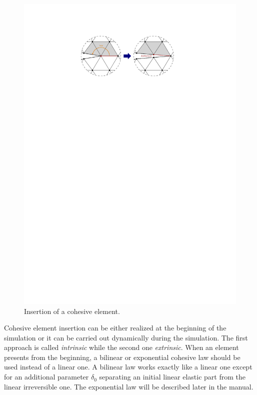 \begin{figure}
  \centering
  \includegraphics[width=.9\textwidth]{figures/insertion}
  \caption{Insertion of a cohesive element.}
  \label{fig:smm:coh:insertion}
\end{figure}

Cohesive element insertion can be either realized at the beginning of
the simulation or it can be carried out dynamically during the
simulation. The first approach is called \emph{intrinsic} while the
second one \emph{extrinsic}. When an element presents from the
beginning, a bilinear or exponential cohesive law should be used
instead of a linear one. A bilinear law works exactly like a linear
one except for an additional parameter $\delta_0$ separating an
initial linear elastic part from the linear irreversible one. The
exponential law will be described later in the manual.

